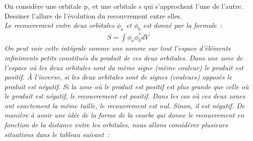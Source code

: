 On consid\`ere une orbitale p$_z$ et une orbitale s qui s'approchent l'une de l'autre.
Dessiner l'allure de l'\'evolution du recouvrement entre elles.\\
\textsl{%
Le recouvrement entre deux orbitales $\phi_a$ et $\phi_b$ est donné par la formule~:
\begin{align*}
S = \int \phi_a \phi_b^* dV
\end{align*}
On peut voir cette intégrale comme une somme sur tout l'espace d'éléments infiniments
petits constitués du produit de ces deux orbitales.
Dans une zone de l'espace où les deux orbitales sont du même signe (même couleur)
le produit est positif.
À l'inverse, si les deux orbitales sont de signes (couleurs) opposés le produit est négatif.
Si la zone où le produit est positif est plus grande que celle où le produit est négatif,
le recouvrement est positif.
Dans les cas où ces deux zones ont exactement la même taille, le recouvrement est nul.
Sinon, il est négatif.
%
De manière à avoir une idée de la forme de la courbe qui donne le recouvrement en fonction
de la distance entre les orbitales, nous allons considérer plusieurs situations dans le tableau suivant~:\\
\hspace*{-8mm}}
